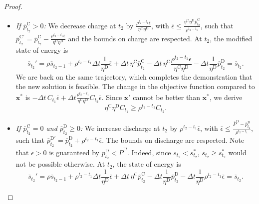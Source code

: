 \documentclass[10pt,a4paper]{amsart}
\newcommand{\up}[1]{^{\mathrm{#1}}}
\begin{document}
\begin{proof}
    \begin{itemize}
        \item \textit{If $\overline{p}\up{C}_{t_2}>0$:} We decrease charge at $t_2$ by $\frac{\rho^{t_2 - t_1} \overline{\epsilon}}{\eta\up{C} \eta\up{D}}$, with $\overline{\epsilon} \leq \frac{\eta\up{C} \eta\up{D} \overline{p}\up{C}_{t_2}}{\rho^{t_2 - t_1}}$, such that $\overline{p}\up{C'}_{t_2}=\overline{p}\up{C}_{t_2} - \frac{\rho^{t_2 - t_1} \overline{\epsilon}}{\eta\up{C} \eta\up{D}}$ and the bounds on charge are respected.
        At $t_2$, the modified state of energy is
        \begin{equation}
            \overline{s}_{t_2}' = \rho \overline{s}_{t_2-1} + \rho^{t_2 - t_1} \Delta t \frac{1}{\eta\up{D}} \overline{\epsilon} + \Delta t \, \eta\up{C} \overline{p}\up{C}_{t_2} - \Delta t \, \eta\up{C} \frac{\rho^{t_2 - t_1} \overline{\epsilon}}{\eta\up{C} \eta\up{D}} - \Delta t \frac{1}{\eta\up{D}} \overline{p}\up{D}_{t_2} = \overline{s}_{t_2}.
        \end{equation}
        We are back on the same trajectory, which completes the demonstration that the new solution is feasible. The change in the objective function compared to $\mathbf{x}^*$ is $- \Delta t \, C_{t_1} \overline{\epsilon} + \Delta t \frac{\rho^{t_2 - t_1}}{\eta\up{C} \eta\up{D}} C_{t_2}  \overline{\epsilon}$. Since $\mathbf{x}'$ cannot be better than $\mathbf{x}^*$, we derive
        \begin{equation} \label{eq:overline_pd_pc}
            \eta\up{C} \eta\up{D} C_{t_1} \geq \rho^{t_2 - t_1} C_{t_2}.
        \end{equation}
        \item \textit{If $\overline{p}\up{C}_{t_2}=0$ and $\overline{p}\up{D}_{t_2}\geq 0$:} We increase discharge at $t_2$ by $\rho^{t_2 - t_1} \overline{\epsilon}$, with $\overline{\epsilon} \leq \frac{\overline{P}\up{D} - \overline{p}\up{D}_{t_2}}{\rho^{t_2 - t_1}}$, such that $\overline{p}\up{D'}_{t_2}=\overline{p}\up{D}_{t_2}+\rho^{t_2 - t_1}\overline{\epsilon}$. The bounds on discharge are respected. Note that $\overline{\epsilon} >0$ is guaranteed by $\overline{p}\up{D}_{t_2} < \overline{P}\up{D}$. Indeed, since $\overline{s}_{t_2} < {s}_{t_2}^*$, $\overline{s}_{t_2} \geq {s}_{t_2}^*$ would not be possible otherwise.
        At $t_2$, the state of energy is
        \begin{equation}
            \overline{s}_{t_2}' = \rho \overline{s}_{t_2-1} + \rho^{t_2 - t_1} \Delta t \frac{1}{\eta\up{D}} \overline{\epsilon} + \Delta t \, \eta\up{C} \overline{p}\up{C}_{t_2} - \Delta t \frac{1}{\eta\up{D}} \overline{p}\up{D}_{t_2} -  \Delta t \frac{1}{\eta\up{D}} \rho^{t_2 - t_1}\overline{\epsilon} =\overline{s}_{t_2}.  

\end{equation}
\end{itemize}
\end{proof}
\end{document}
